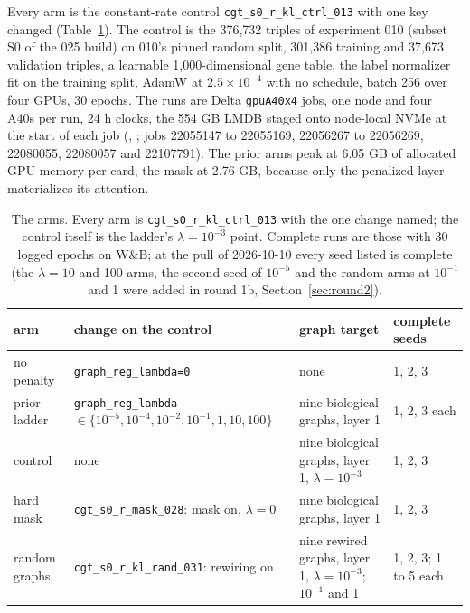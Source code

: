 Every arm is the constant-rate control \texttt{cgt\_s0\_r\_kl\_ctrl\_013} with one key
changed (Table~\ref{tab:design}). The control is the 376{,}732 triples of experiment 010
(subset S0 of the 025 build) on 010's pinned random split, 301{,}386 training and
37{,}673 validation triples, a learnable 1{,}000-dimensional gene table, the label
normalizer fit on the training split, AdamW at $2.5 \times 10^{-4}$ with no schedule,
batch 256 over four GPUs, 30 epochs. The runs are Delta \texttt{gpuA40x4} jobs, one node
and four A40s per run, 24 h clocks, the 554 GB LMDB staged onto node-local NVMe at the
start of each job (,
; jobs 22055147 to
22055169, 22056267 to 22056269, 22080055, 22080057 and 22107791). The prior arms peak at
6.05 GB of allocated GPU memory per card, the mask at 2.76 GB, because only the
penalized layer materializes its attention.

\begin{table}[htbp]
\centering
\footnotesize
\caption{The arms. Every arm is \texttt{cgt\_s0\_r\_kl\_ctrl\_013} with the one change
named; the control itself is the ladder's $\lambda = 10^{-3}$ point. Complete runs are
those with 30 logged epochs on W\&B; at the pull of 2026-10-10 every seed listed is
complete (the $\lambda = 10$ and 100 arms, the second seed of $10^{-5}$ and the random
arms at $10^{-1}$ and 1 were added in round 1b, Section~\ref{sec:round2}).}
\label{tab:design}
\begin{tabular}{lp{5.6cm}p{4.4cm}p{2.8cm}}
\toprule
arm & change on the control & graph target & complete seeds \\
\midrule
no penalty & \texttt{graph\_reg\_lambda=0} & none & 1, 2, 3 \\
prior ladder & \texttt{graph\_reg\_lambda} $\in \{10^{-5}, 10^{-4}, 10^{-2}, 10^{-1}, 1, 10, 100\}$ & nine biological graphs, layer 1 & 1, 2, 3 each \\
control & none & nine biological graphs, layer 1, $\lambda = 10^{-3}$ & 1, 2, 3 \\
hard mask & \texttt{cgt\_s0\_r\_mask\_028}: mask on, $\lambda = 0$ & nine biological graphs, layer 1 & 1, 2, 3 \\
random graphs & \texttt{cgt\_s0\_r\_kl\_rand\_031}: rewiring on & nine rewired graphs, layer 1, $\lambda = 10^{-3}$; $10^{-1}$ and 1 & 1, 2, 3; 1 to 5 each \\
\bottomrule
\end{tabular}
\end{table}


